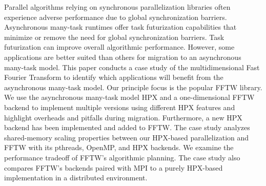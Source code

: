 Parallel algorithms relying on synchronous parallelization libraries often experience adverse performance due to global synchronization barriers. Asynchronous many-task runtimes offer task futurization capabilities that minimize or remove the need for global synchronization barriers. Task futurization can improve overall algorithmic performance. However, some applications are better suited than others for migration to an asynchronous many-task model. This paper conducts a case study of the multidimensional Fast Fourier Transform to identify which applications will benefit from the asynchronous many-task model. Our principle focus is the popular FFTW library. We use the asynchronous many-task model HPX and a one-dimensional FFTW backend to implement multiple versions using different HPX features and highlight overheads and pitfalls during migration. Furthermore, a new HPX backend has been implemented and added to FFTW. The case study analyzes shared-memory scaling properties between our HPX-based parallelization and FFTW with its pthreads, OpenMP, and HPX backends. We examine the performance tradeoff of FFTW's algorithmic planning. The case study also compares FFTW's backends paired with MPI to a purely HPX-based implementation in a distributed environment.
